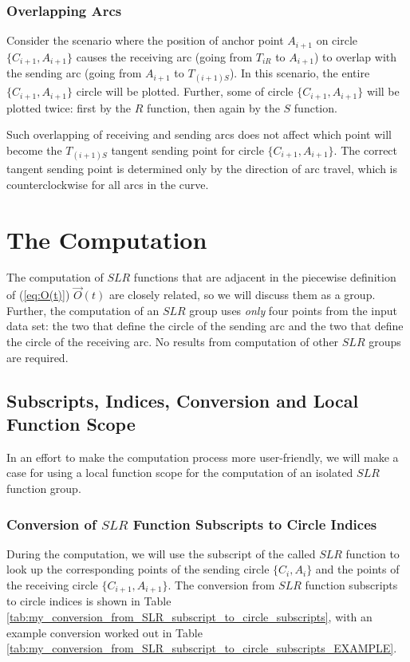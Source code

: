 \documentclass{article}
\begin{document}
\subsubsection{Overlapping Arcs}
Consider the scenario where the position of anchor point $A_{i+1}$ on circle $\{C_{i+1}, A_{i+1}\}$ causes the receiving arc (going from $T_{iR}$ to $A_{i+1}$) to overlap with the sending arc (going from $A_{i+1}$ to $T_{(i+1)S}$). In this scenario, the entire $\{C_{i+1}, A_{i+1}\}$ circle will be plotted. Further, some of circle $\{C_{i+1}, A_{i+1}\}$ will be plotted twice: first by the $R$ function, then again by the $S$ function.

Such overlapping of receiving and sending arcs does not affect which point will become the $T_{(i+1)S}$ tangent sending point for circle $\{C_{i+1}, A_{i+1}\}$. The correct tangent sending point is determined only by the direction of arc travel, which is counterclockwise for all arcs in the curve.

\section{The Computation}
\label{sec:the_computation}
The computation of $SLR$ functions that are adjacent in the piecewise definition of (\ref{eq:O(t)}) $\overrightarrow{O}(t)$ are closely related, so we will discuss them as a group. Further, the computation of an $SLR$ group uses \textit{only} four points from the input data set: the two that define the circle of the sending arc and the two that define the circle of the receiving arc. No results from computation of other $SLR$ groups are required.

\subsection{Subscripts, Indices, Conversion and Local Function Scope}
In an effort to make the computation process more user-friendly, we will make a case for using a local function scope for the computation of an isolated $SLR$ function group.
\subsubsection{Conversion of $SLR$ Function Subscripts to Circle Indices}
\label{subsubsec:SLR_subscript_conversion}
During the computation, we will use the subscript of the called $SLR$ function to look up the corresponding points of the sending circle $\{C_i, A_i\}$ and the points of the receiving circle $\{C_{i+1}, A_{i+1}\}$. The conversion from $SLR$ function subscripts to circle indices is shown in Table \ref{tab:my_conversion_from_SLR_subscript_to_circle_subscripts}, with an example conversion worked out in Table \ref{tab:my_conversion_from_SLR_subscript_to_circle_subscripts_EXAMPLE}.
\end{document}
